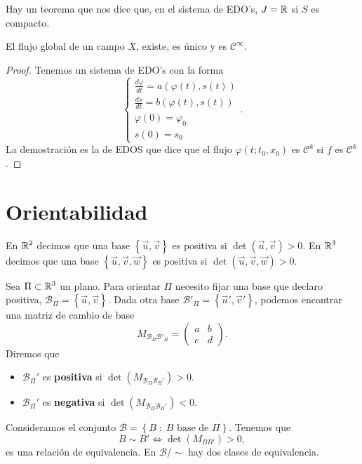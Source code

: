 \begin{observation}
Hay un teorema que nos dice que, en el sistema de EDO's, $\displaystyle J = \mathbb{R} $ si $\displaystyle S $ es compacto. 
\end{observation}
\begin{theorem}
El flujo global de un campo $\displaystyle X $, existe, es único y es $\displaystyle \mathcal{C}^{\infty } $. 
\end{theorem}
\begin{proof}
Tenemos un sistema de EDO's con la forma 
\[
\begin{cases}
\frac{d\varphi}{dt}=a\left(\varphi\left(t\right), s\left(t\right)\right) \\
\frac{d s}{dt}=b\left(\varphi\left(t\right), s\left(t\right)\right) \\
\varphi\left(0\right) =\varphi_{0} \\
s\left(0\right)=s_{0}
\end{cases}
.\]
La demostración es la de EDOS que dice que el flujo $\displaystyle \varphi\left(t; t_{0}, x_{0}\right) $ es $\displaystyle \mathcal{C}^{k} $ si $\displaystyle f  $ es $\displaystyle \mathcal{C}^{k} $. 
\end{proof}
\section{Orientabilidad}
En $\displaystyle \mathbb{R}^{2} $ decimos que una base $\displaystyle \left\{ \vec{u}, \vec{v}\right\}  $ es positiva si $\displaystyle \det\left(\vec{u},\vec{v}\right) > 0 $. En $\displaystyle \mathbb{R}^{3} $ decimos que una base $\displaystyle \left\{ \vec{u}, \vec{v}, \vec{w}\right\}  $ es positiva si $\displaystyle \det\left(\vec{u}, \vec{v}, \vec{w}\right)>0 $. \\

\begin{notation}
Sea $\displaystyle \Pi\subset \mathbb{R}^{3} $ un plano. Para orientar $\displaystyle \Pi $ necesito fijar una base que declaro positiva, $\displaystyle \mathcal{B}_{\Pi}= \left\{ \vec{u}, \vec{v}\right\}  $. Dada otra base $\displaystyle \mathcal{B}'_{\Pi} = \left\{ \vec{u}', \vec{v}'\right\}  $, podemos encontrar una matriz de cambio de base
\[M_{\mathcal{B}_{\Pi}\mathcal{B}'_{\Pi}} = \begin{pmatrix} a & b \\ c & d \end{pmatrix} .\]
Diremos que 
\begin{itemize}
\item $\displaystyle \mathcal{B}_{\Pi}' $ es \textbf{positiva} si $\displaystyle \det\left(M_{\mathcal{B}_{\Pi}\mathcal{B}_{\Pi}'}\right) > 0 $.
\item $\displaystyle \mathcal{B}_{\Pi}' $ es \textbf{negativa} si $\displaystyle \det\left(M_{\mathcal{B}_{\Pi}\mathcal{B}_{\Pi}'}\right) < 0 $.
\end{itemize}
Consideramos el conjunto $\displaystyle \mathcal{B}= \left\{ B \; : \; B \text{ base de } \Pi\right\}  $. Tenemos que  
\[ B \sim B' \iff \det\left(M_{BB'}\right)>0 ,\]
es una relación de equivalencia. En $\displaystyle \mathcal{B}/\sim $ hay dos clases de equivalencia. 
\end{notation}


